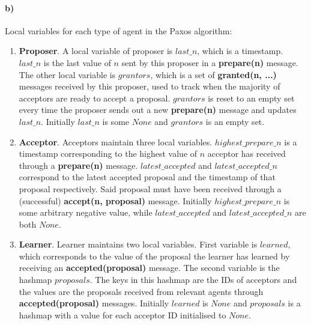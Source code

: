 \documentclass[10pt,letter]{article}
\begin{document}
\pagebreak

\paragraph{b)} Local variables for each type of agent in the Paxos algorithm:

\begin{enumerate}
\item{\textbf{Proposer}.} A local variable of proposer is $last\_n$, which is a timestamp. $last\_n$ is the last value of $n$ sent by this proposer in a \textbf{prepare(n)} message. The other local variable is $grantors$, which is a set of \textbf{granted(n, ...)} messages received by this proposer, used to track when the majority of acceptors are ready to accept a proposal. $grantors$ is reset to an empty set every time the proposer sends out a new \textbf{prepare(n)} message and updates $last\_n$. Initially $last\_n$ is some $None$ and $grantors$ is an empty set.

\item{\textbf{Acceptor}.} Acceptors maintain three local variables. $highest\_prepare\_n$ is a timestamp corresponding to the highest value of $n$ acceptor has received through a \textbf{prepare(n)} message. $latest\_accepted$ and $latest\_accepted\_n$ correspond to the latest accepted proposal and the timestamp of that proposal respectively. Said proposal must have been received through a (successful) \textbf{accept(n, proposal)} message. Initially $highest\_prepare\_n$ is some arbitrary negative value, while $latest\_accepted$ and $latest\_accepted\_n$ are both $None$.

\item{\textbf{Learner}.} Learner maintains two local variables. First variable is $learned$, which corresponds to the value of the proposal the learner has learned by receiving an \textbf{accepted(proposal)} message. The second variable is the hashmap $proposals$. The keys in this hashmap are the IDs of acceptors and the values are the proposals received from relevant agents through \textbf{accepted(proposal)} messages. Initially $learned$ is $None$ and $proposals$ is a hashmap with a value for each acceptor ID initialised to $None$.
\end{enumerate}

\pagebreak
\end{document}
